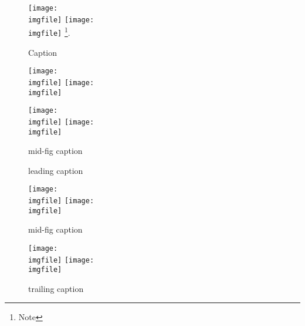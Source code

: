 \documentclass{article}
\def\imgfile{../graphics/none.png}
\begin{document}
\begin{figure}
  \texttt{[image: \\imgfile]}\hspace{2cm}%
  \texttt{[image: \\imgfile]}%
  \footnote{Note}.
  \caption{Caption}
\end{figure}
\clearpage

\begin{figure}
  \texttt{[image: \\imgfile]}\hspace{2cm}%
  \texttt{[image: \\imgfile]}\newline
  \caption{mid-fig caption}
  \texttt{[image: \\imgfile]}\hspace{2cm}%
  \texttt{[image: \\imgfile]}%
\end{figure}
\clearpage

\begin{figure}
  \caption{leading caption}
  \texttt{[image: \\imgfile]}\hspace{2cm}%
  \texttt{[image: \\imgfile]}\newline
  \caption{mid-fig caption}
  \texttt{[image: \\imgfile]}\hspace{2cm}%
  \texttt{[image: \\imgfile]}%
  \caption{trailing caption}
\end{figure}
\clearpage
\end{document}
